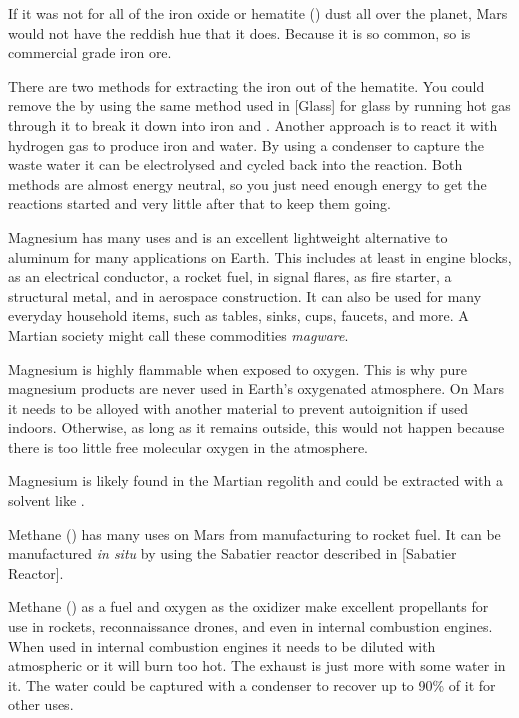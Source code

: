 If it was not for all of the iron oxide or hematite () dust all over the planet, Mars would not have the reddish hue that it does. Because it is so common, so is commercial grade iron ore. 

There are two methods for extracting the iron out of the hematite. You could remove the  by using the same method used in [Glass] for glass by running hot  gas through it to break it down into iron and . Another approach is to react it with hydrogen gas to produce iron and water. By using a condenser to capture the waste water it can be electrolysed and cycled back into the reaction. Both methods are almost energy neutral, so you just need enough energy to get the reactions started and very little after that to keep them going.

Magnesium has many uses and is an excellent lightweight alternative to aluminum for many applications on Earth. This includes at least in engine blocks, as an electrical conductor, a rocket fuel, in signal flares, as fire starter, a structural metal, and in aerospace construction. It can also be used for many everyday household items, such as tables, sinks, cups, faucets, and more. A Martian society might call these commodities {\it magware}.

Magnesium is highly flammable when exposed to oxygen. This is why pure magnesium products are never used in Earth's oxygenated atmosphere. On Mars it needs to be alloyed with another material to prevent autoignition if used indoors. Otherwise, as long as it remains outside, this would not happen because there is too little free molecular oxygen in the atmosphere.

Magnesium is likely found in the Martian regolith and could be extracted with a solvent like .

Methane () has many uses on Mars from manufacturing to rocket fuel. It can be manufactured {\it in situ} by using the Sabatier reactor described in [Sabatier Reactor].

Methane () as a fuel and oxygen as the oxidizer make excellent propellants for use in rockets, reconnaissance drones, and even in internal combustion engines. When used in internal combustion engines it needs to be diluted with atmospheric  or it will burn too hot. The exhaust is just more  with some water in it. The water could be captured with a condenser to recover up to 90\% of it for other uses.

